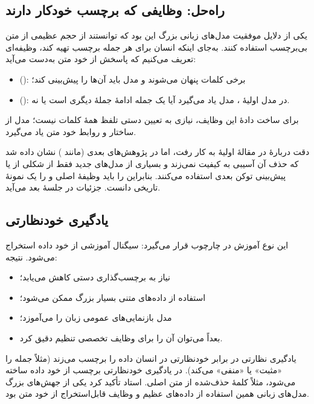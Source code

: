 \subsection{راه‌حل: وظایفی که برچسب خودکار دارند}
یکی از دلایل موفقیت مدل‌های زبانی بزرگ این بود که توانستند از حجم عظیمی از متن بی‌برچسب استفاده کنند. به‌جای اینکه انسان برای هر جمله برچسب تهیه کند، وظیفه‌ای تعریف می‌کنیم که پاسخش از خود متن به‌دست می‌آید:
\begin{itemize}
  \item {} (): برخی کلمات پنهان می‌شوند و مدل باید آن‌ها را پیش‌بینی کند؛
  \item {} (): در مدل اولیهٔ ، مدل یاد می‌گیرد آیا یک جمله ادامهٔ جملهٔ دیگری است یا نه.
\end{itemize}
برای ساخت دادهٔ این وظایف، نیازی به تعیین دستی تلفظ همهٔ کلمات نیست؛ مدل از ساختار و روابط خود متن یاد می‌گیرد.

\begin{correctionbox}{دقت دربارهٔ }
 در مقالهٔ اولیهٔ  به کار رفت، اما در پژوهش‌های بعدی (مانند ) نشان داده شد که حذف آن آسیبی به کیفیت نمی‌زند و بسیاری از مدل‌های جدید فقط از شکلی از  یا پیش‌بینی توکن بعدی استفاده می‌کنند. بنابراین  را باید وظیفهٔ اصلی و  را یک نمونهٔ تاریخی دانست. جزئیات  در جلسهٔ بعد می‌آید.
\end{correctionbox}

\subsection{یادگیری خودنظارتی}
این نوع آموزش در چارچوب  قرار می‌گیرد: سیگنال آموزشی از خود داده استخراج می‌شود. نتیجه:
\begin{itemize}
  \item نیاز به برچسب‌گذاری دستی کاهش می‌یابد؛
  \item استفاده از داده‌های متنی بسیار بزرگ ممکن می‌شود؛
  \item مدل بازنمایی‌های عمومی زبان را می‌آموزد؛
  \item بعداً می‌توان آن را برای وظایف تخصصی تنظیم دقیق کرد.
\end{itemize}
\begin{definitionbox}{یادگیری نظارتی در برابر خودنظارتی}
در  انسان داده را برچسب می‌زند (مثلاً جمله را «مثبت» یا «منفی» می‌کند). در یادگیری خودنظارتی برچسب از خود داده ساخته می‌شود، مثلاً کلمهٔ حذف‌شده از متن اصلی. استاد تأکید کرد یکی از جهش‌های بزرگ مدل‌های زبانی همین استفاده از داده‌های عظیم و وظایف قابل‌استخراج از خود متن بود.
\end{definitionbox}

